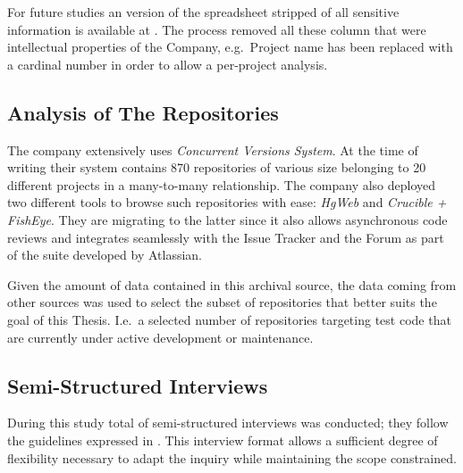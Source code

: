 


For future studies an version of the spreadsheet stripped of all sensitive information is available at . The process removed all these column that were intellectual properties of the Company, e.g.\ Project name has been replaced with a cardinal number in order to allow a per-project analysis.


\subsection{Analysis of The Repositories} \label{sec:analysis_of_the_repos}
The company extensively uses \textit{Concurrent Versions System}. At the time of writing their system contains 870 repositories of various size belonging to 20 different projects in a many-to-many relationship. The company also deployed two different tools to browse such repositories with ease: \textit{HgWeb} and \textit{Crucible + FishEye}. They are migrating to the latter since it also allows asynchronous code reviews and integrates seamlessly with the Issue Tracker and the Forum as part of the suite developed by Atlassian.

Given the amount of data contained in this archival source, the data coming from other sources was used to select the subset of repositories that better suits the goal of this Thesis. I.e.\ a selected number of repositories targeting test code that are currently under active development or maintenance.


\subsection{Semi-Structured Interviews} \label{sec:semi-structured_interviews}
During this study total of  semi-structured interviews was conducted; they follow the guidelines expressed in \cite{interview_guideline}. This interview format allows a sufficient degree of flexibility necessary to adapt the inquiry while maintaining the scope constrained.




%
%
%
%


